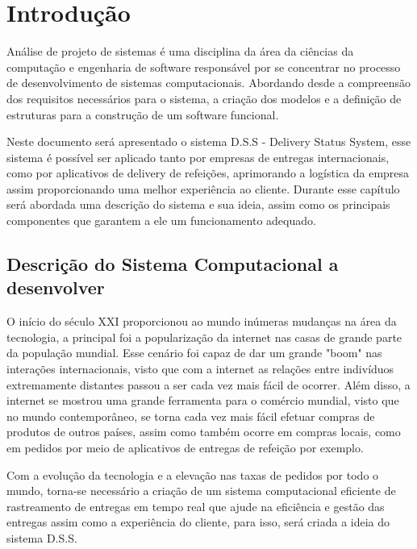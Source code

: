 

\chapter{ Introdu\c{c}\~{a}o}

Análise de projeto de sistemas é uma disciplina da área da ciências da computação e engenharia de software responsável por se concentrar no processo de desenvolvimento de sistemas computacionais. Abordando desde a compreensão dos requisitos necessários para o sistema, a criação dos modelos e a definição de estruturas para a construção de um software funcional. 

Neste documento será apresentado o sistema D.S.S - Delivery Status System, esse sistema é possível ser aplicado tanto por empresas de entregas internacionais, como por aplicativos de delivery de refeições, aprimorando a logística da empresa assim proporcionando uma melhor experiência ao cliente. Durante esse capítulo será abordada uma descrição do sistema e sua ideia, assim como os principais componentes que garantem a ele um funcionamento adequado.

 \section{Descri\c{c}\~{a}o do Sistema Computacional a desenvolver}
 
 	O início do século XXI proporcionou ao mundo inúmeras mudanças na área da tecnologia, a principal foi a popularização da internet nas casas de grande parte da população mundial. Esse cenário foi capaz de dar um grande "boom" nas interações internacionais, visto que com a internet as relações entre indivíduos extremamente distantes passou a ser cada vez mais fácil de ocorrer. Além disso, a internet se mostrou uma grande ferramenta para o comércio mundial, visto que no mundo contemporâneo, se torna cada vez mais fácil efetuar compras de produtos de outros países, assim como também ocorre em compras locais, como em pedidos por meio de aplicativos de entregas de refeição por exemplo. 
 	
 	Com a evolução da tecnologia e a elevação nas taxas de pedidos por todo o mundo, torna-se necessário a criação de um sistema computacional eficiente de rastreamento de entregas em tempo real que ajude na eficiência e gestão das entregas assim como a experiência do cliente, para isso, será criada a ideia do sistema D.S.S.  

